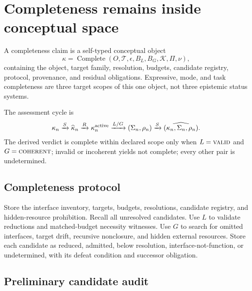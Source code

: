 \documentclass[11pt]{article}
\newcommand{\valid}{\textsc{valid}}
\newcommand{\coherent}{\textsc{coherent}}
\newcommand{\Tt}{\mathcal{T}}
\newcommand{\K}{\mathcal{K}}
\begin{document}
\section{Completeness remains inside conceptual space}

A completeness claim is a self-typed conceptual object
\begin{equation}
\kappa=\operatorname{Complete}(O,\Tt,\epsilon,B_L,B_G,\K,\Pi,\nu),
\end{equation}
containing the object, target family, resolution, budgets, candidate registry, protocol, provenance, and residual obligations. Expressive, mode, and task completeness are three target scopes of this one object, not three epistemic status systems.

The assessment cycle is
\begin{equation}
\kappa_n\xrightarrow{S}\widehat\kappa_n\xrightarrow{R}\kappa_n^{\rm active}
\xrightarrow{L/G}(\Sigma_n,\rho_n)\xrightarrow{S}\widehat{(\kappa_n,\Sigma_n,\rho_n)}.
\end{equation}
The derived verdict is complete within declared scope only when $L=\valid$ and $G=\coherent$; invalid or incoherent yields not complete; every other pair is undetermined.

\subsection{Completeness protocol}

Store the interface inventory, targets, budgets, resolutions, candidate registry, and hidden-resource prohibition. Recall all unresolved candidates. Use $L$ to validate reductions and matched-budget necessity witnesses. Use $G$ to search for omitted interfaces, target drift, recursive nonclosure, and hidden external resources. Store each candidate as reduced, admitted, below resolution, interface-not-function, or undetermined, with its defeat condition and successor obligation.

\subsection{Preliminary candidate audit}
\end{document}
